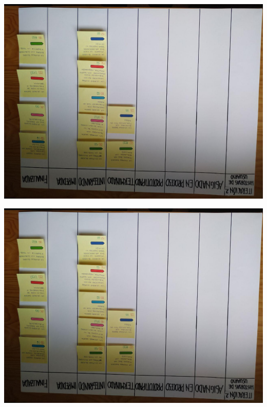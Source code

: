 \documentclass[spanish]{beamer}
\begin{document}
\begin{frame}
	\begin{center}
		\includegraphics[angle=180, scale=0.34]{papel2_7}
	\end{center}
\end{frame}

\begin{frame}
	\begin{center}
		\includegraphics[angle=180, scale=0.33]{papel2_8}
	\end{center}
\end{frame}
\end{document}
